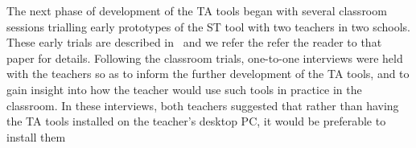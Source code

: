 The next phase of development of the TA tools began with several
classroom sessions trialling early prototypes of the ST tool with two teachers
in two schools. %
These early trials are described in~\cite{IEEE-TLT-TA} and 
we refer the refer the reader to that paper for details. 
%
% 
%
Following the classroom trials, one-to-one
interviews were held with the teachers so as to inform the further
development of the TA tools, and to gain insight into how the
teacher would use such tools in practice in the classroom. 
In these interviews, both teachers suggested that rather than
having the TA tools installed on the teacher's desktop PC, 
it would be preferable to install them
